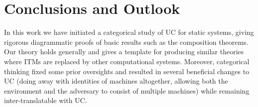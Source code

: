 \section{Conclusions and Outlook}\label{sec:conclusion}

In this work we have initiated a categorical study of UC for static systems, giving rigorous diagrammatic proofs of basic results such as the composition theorems. Our theory holds generally and gives a template for producing similar theories where ITMs are replaced by other computational systems. Moreover, categorical thinking fixed some prior oversights and resulted in several beneficial changes to UC (doing away with identities of machines altogether, allowing both the environment and the adversary to consist of multiple machines) while remaining inter-translatable with UC. 

